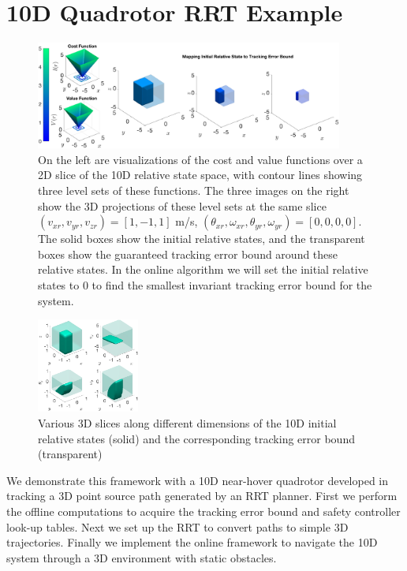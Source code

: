 \section{10D Quadrotor RRT Example \label{sec:results}}
\begin{figure}
	\centering
	\includegraphics[width=0.9\textwidth]{fig/quad10D_example_cost}
	\caption{On the left are visualizations of the cost and value functions over a 2D slice of the 10D relative state space, with contour lines showing three level sets of these functions. The three images on the right show the 3D projections of these level sets at the same slice $(v_{xr},v_{yr},v_{zr})=[1, -1, 1]$ m/s, $(\theta_{xr},\omega_{xr},\theta_{yr},\omega_{yr})=[0,0,0,0]$. The solid boxes show the initial relative states, and the transparent boxes show the guaranteed tracking error bound around these relative states. In the online algorithm we will set the initial relative states to 0 to find the smallest invariant tracking error bound for the system.}
	\label{fig:quad10D_example}
	\end{figure} 
\begin{figure}
	\centering
	\includegraphics[width=0.3\textwidth]{fig/quad10D_slices}
	\caption{Various 3D slices along different dimensions of the 10D initial relative states (solid) and the corresponding tracking error bound (transparent)}
	\label{fig:quad10D_example_slices}
	\vspace{-.2in}
\end{figure} 
We demonstrate this framework with a 10D near-hover quadrotor developed in \cite{Bouffard12} tracking a 3D point source path generated by an RRT planner. First we perform the offline computations to acquire the tracking error bound and safety controller look-up tables. Next we set up the RRT to convert paths to simple 3D trajectories. Finally we implement the online framework to navigate the 10D system through a 3D environment with static obstacles.

